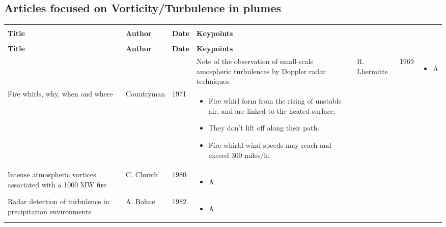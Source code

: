 \documentclass[12pt]{article}
\begin{document}
\subsection{Articles focused on Vorticity/Turbulence in plumes}

\begin{center}
\begin{longtable}{|p{4.5cm}|p{2cm}|p{0.8cm}|p{7.5cm}|}

\hline
 & & & \tabularnewline
\textbf{Title} & \textbf{Author} & \textbf{Date} & \textbf{Keypoints} \tabularnewline
 & & & \endfirsthead
 \hline
 
 \hline
 & & & \tabularnewline
\textbf{Title} & \textbf{Author} & \textbf{Date} & \textbf{Keypoints} \tabularnewline
 & & & \endhead
 \hline
 
 \hline
\endlastfoot
 \hline
 
 \hline
\endfoot
 \hline
 
 
\raggedright Note of the observation of small-scale amospheric turbulences by Doppler radar techniques & R. Lhermitte & 1969 & \raggedleft 
\begin{itemize} 
\item A
\end{itemize} 
\tabularnewline

\hline 

\raggedright Fire whirls, why, when and where & Countryman & 1971 & \raggedleft 
\begin{itemize} 
\item Fire whirl form from the rising of unstable air, and are linked to the heated surface.
\item They don't lift off along their path. 
\item Fire whirld wind speeds may reach and exceed 300 miles/h.
\end{itemize} 
\tabularnewline

\hline

\raggedright Intense atmospheric vortices associated with a 1000 MW fire & C. Church & 1980 & \raggedleft 
\begin{itemize} 
\item A
\end{itemize} 
\tabularnewline

\hline

\raggedright Radar detection of turbulence in precipitation environments & A. Bohne & 1982 & \raggedleft 
\begin{itemize} 
\item A
\end{itemize} 
\tabularnewline


\end{longtable}
\end{center}
\end{document}
